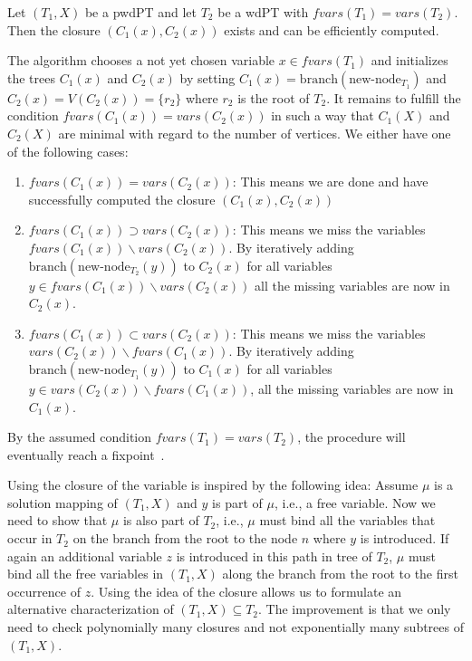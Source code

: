 \begin{proposition}
	Let $(T_1,X)$ be a pwdPT and let $T_2$ be a wdPT with $fvars(T_1) =
	vars(T_2)$. Then the closure $(C_1(x),C_2(x))$ exists and can be
	efficiently computed.
\end{proposition}
\begin{proofidea}
	The algorithm chooses a not yet chosen variable $x \in fvars(T_1)$ and
	initializes the trees $C_1(x)$ and $C_2(x)$ by setting $C_1(x) =
	\mbox{branch}(\mbox{new-node}_{T_1})$ and $C_2(x) = V(C_2(x)) = \{r_2\}$ where $r_2$ is
	the root of $T_2$. It remains to fulfill the condition $fvars(C_1(x)) =
	vars(C_2(x))$ in such a way that $C_1(X)$ and $C_2(X)$ are minimal with
	regard to the number of vertices. We either have one of the following cases:
	\begin{enumerate}
		\item $fvars(C_1(x)) = vars(C_2(x))$: This means we are done and have
			successfully computed the closure $(C_1(x), C_2(x))$
		\item $fvars(C_1(x)) \supset vars(C_2(x))$: This means we miss the
			variables\\ $fvars(C_1(x)) \backslash vars(C_2(x))$. By
			iteratively adding $\mbox{branch}(\mbox{new-node}_{T_2}(y))$ to $C_2(x)$ for all
			variables\\ $y \in fvars(C_1(x)) \backslash vars(C_2(x))$ all
			the missing variables are now in $C_2(x)$.
		\item $fvars(C_1(x)) \subset vars(C_2(x))$: This means we miss the
			variables\\ $vars(C_2(x)) \backslash fvars(C_1(x))$. By iteratively
			adding $\mbox{branch}(\mbox{new-node}_{T_1}(y))$ to $C_1(x)$ for all variables
			$y \in vars(C_2(x)) \backslash fvars(C_1(x))$, all the missing
			variables are now in $C_1(x)$.
	\end{enumerate}
	By the assumed condition $fvars(T_1) = vars(T_2)$, the procedure will
	eventually reach a fixpoint~\cite{pichler2014containment}.
\end{proofidea}

Using the closure of the variable is inspired by the following idea:
Assume $\mu$ is a solution mapping of $(T_1,X)$ and $y$ is part of $\mu$, i.e.,
a free variable. Now we need to show that $\mu$ is also part of $T_2$, i.e.,
$\mu$ must bind all the variables that occur in $T_2$ on the branch from the
root to the node $n$ where $y$ is introduced. If again an additional variable
$z$ is introduced in this path in tree of $T_2$, $\mu$ must bind all the free
variables in $(T_1,X)$ along the branch from the root to the first occurrence of
$z$. Using the idea of the closure allows us to formulate an alternative characterization of
$(T_1,X) \subseteq T_2$. The improvement is that we only need to check
polynomially many closures and not exponentially many subtrees of $(T_1,X)$.

